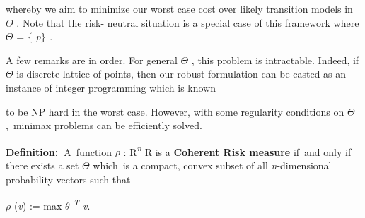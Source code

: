 \documentclass[12pt,twoside]{article}
\begin{document}
\vspace{\baselineskip}
\begin{adjustwidth}{0.08in}{0.54in}
{\fontsize{10pt}{12.0pt}\selectfont whereby we aim to minimize our worst case cost over likely transition models in $ \Theta $ . Note that the risk- neutral situation is a special case of this framework where $ \Theta $  = $ \{ $ \textit{p$ \} $ .}\par}\par

\end{adjustwidth}

\begin{adjustwidth}{0.08in}{0.54in}
{\fontsize{10pt}{12.0pt}\selectfont A few remarks are in order. For general $ \Theta $ , this problem is intractable. Indeed, if $ \Theta $  is discrete lattice of points, then our robust formulation can be casted as an instance of integer programming which is known\par}\par

\end{adjustwidth}


\vspace{\baselineskip}

\vspace{\baselineskip}
\begin{adjustwidth}{0.58in}{0.14in}
{\fontsize{10pt}{12.0pt}\selectfont to be NP hard in the worst case. However, with some regularity conditions on $ \Theta $ ,\ minimax problems can  be efficiently solved.\par}\par

\end{adjustwidth}

\begin{adjustwidth}{0.58in}{0.14in}
\begin{FlushLeft}
{\fontsize{10pt}{12.0pt}\selectfont \textbf{Definition:\  }A\ function  \textit{$ \rho $  }: R\textit{\textsuperscript{n \tabto{2.61in} }}R is a \textbf{Coherent Risk measure }if\ and only if there exists a set  $ \Theta $  which\ is  a compact, convex subset of all \textit{n}-dimensional probability vectors such that\par}
\end{FlushLeft}\par

\end{adjustwidth}

\begin{adjustwidth}{0.85in}{0.34in}
\begin{Center}
{\fontsize{10pt}{12.0pt}\selectfont \textit{$ \rho $ }(\textit{v}) := max \textit{$ \theta $ \textsuperscript{T} v}.\par}
\end{Center}\par

\end{adjustwidth}
\end{document}

